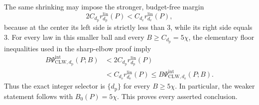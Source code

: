 The same shrinking may impose the stronger, budget-free margin
\[
 2C_{d_{\mathrm p}}r_{d_{\mathrm p}}^{\mathrm{lin}}(P)
 <C_{d_{\mathrm e}}r_{d_{\mathrm e}}^{\mathrm{lin}}(P),   \tag{33}
\]
because at the center its left side is strictly less than \(3\), while its right side equals \(3\).  For every law in this smaller ball and every \(B\ge C_{d_{\mathrm p}}=5\chi\), the elementary floor inequalities used in the sharp-elbow proof imply
\[
\begin{aligned}
 B\Psi_{\mathrm{CLW},d_{\mathrm p}}^{\mathrm{int}}(P;B)
 &<2C_{d_{\mathrm p}}r_{d_{\mathrm p}}^{\mathrm{lin}}(P)\\
 &<C_{d_{\mathrm e}}r_{d_{\mathrm e}}^{\mathrm{lin}}(P)
 \le B\Psi_{\mathrm{CLW},d_{\mathrm e}}^{\mathrm{int}}(P;B).
\end{aligned}                                               \tag{34}
\]
Thus the exact integer selector is \(\{d_{\mathrm p}\}\) for every \(B\ge5\chi\).  In particular, the weaker statement follows with \(B_0(P)=5\chi\).  This proves every asserted conclusion.